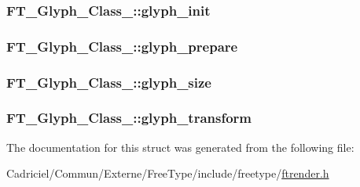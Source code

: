 \hypertarget{struct_f_t___glyph___class___a657200ad15ff061b38fb25b168737f95}{
\subsubsection[{glyph\-\_\-init}]{ F\-T\-\_\-\-Glyph\-\_\-\-Class\-\_\-\-::glyph\-\_\-init}}\label{struct_f_t___glyph___class___a657200ad15ff061b38fb25b168737f95}
\hypertarget{struct_f_t___glyph___class___af7f406e5ea20a6614c946746938830c9}{
\subsubsection[{glyph\-\_\-prepare}]{ F\-T\-\_\-\-Glyph\-\_\-\-Class\-\_\-\-::glyph\-\_\-prepare}}\label{struct_f_t___glyph___class___af7f406e5ea20a6614c946746938830c9}
\hypertarget{struct_f_t___glyph___class___a1a76c68b9fb0e93947e888c0fe77cbf8}{
\subsubsection[{glyph\-\_\-size}]{ F\-T\-\_\-\-Glyph\-\_\-\-Class\-\_\-\-::glyph\-\_\-size}}\label{struct_f_t___glyph___class___a1a76c68b9fb0e93947e888c0fe77cbf8}
\hypertarget{struct_f_t___glyph___class___a5f72ac1d0d92eb31fa3e2bb721a97ef2}{
\subsubsection[{glyph\-\_\-transform}]{ F\-T\-\_\-\-Glyph\-\_\-\-Class\-\_\-\-::glyph\-\_\-transform}}\label{struct_f_t___glyph___class___a5f72ac1d0d92eb31fa3e2bb721a97ef2}


The documentation for this struct was generated from the following file\-:\begin{DoxyCompactItemize}
\item 
Cadriciel/\-Commun/\-Externe/\-Free\-Type/include/freetype/\hyperlink{ftrender_8h}{ftrender.\-h}\end{DoxyCompactItemize}
